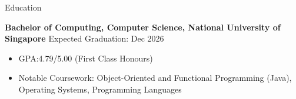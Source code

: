 \documentclass{phanuphat_srisukhawasu_resume} %
\begin{document}

%
%


\begin{rSection}{Education}

  \textbf{Bachelor of Computing, Computer Science, National University of Singapore} \hfill {Expected Graduation: Dec 2026}
  \begin{itemize}
    \item GPA:\@ 4.79/5.00 (First Class Honours)
    \item Notable Coursework: Object-Oriented and Functional Programming (Java), Operating Systems, Programming Languages
  \end{itemize}

\end{rSection}

\end{document}
